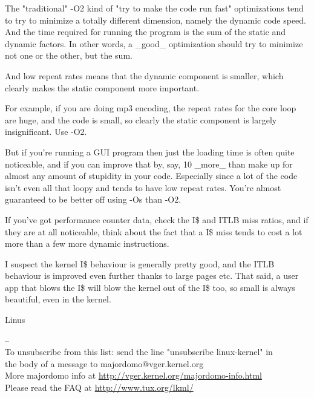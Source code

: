 \documentclass[amstex,twoside]{ctexbook}
\newenvironment{insertnote}{ \ttfamily\CJKfamily{KaiTi} }{\vskip 0.5cm }
\begin{document}
\begin{insertnote}
The "traditional" -O2 kind of "try to make the code run fast" 
optimizations tend to try to minimize a totally different dimension, 
namely the dynamic code speed.
And the time required for running the program is the sum of the static and 
dynamic factors. In other words, a \_good\_ optimization should try to 
minimize not one or the other, but the sum.

And low repeat rates means that the dynamic component is smaller, which 
clearly makes the static component more important.

For example, if you are doing mp3 encoding, the repeat rates for the core 
loop are huge, and the code is small, so clearly the static component is 
largely insignificant. Use -O2.

But if you're running a GUI program then just the loading time is often
quite noticeable, and if you can improve that by, say, 10%
\_more\_ than make up for almost any amount of stupidity in your code.  
Especially since a lot of the code isn't even all that loopy and tends to
have low repeat rates. You're almost guaranteed to be better off using -Os
than -O2.

If you've got performance counter data, check the I\$ and ITLB miss ratios, 
and if they are at all noticeable, think about the fact that a I\$ miss 
tends to cost a lot more than a few more dynamic instructions. 

I suspect the kernel I\$ behaviour is generally pretty good, and the ITLB 
behaviour is improved even further thanks to large pages etc. That said, a 
user app that blows the I\$ will blow the kernel out of the I\$ too, so 
small is always beautiful, even in the kernel.

\qquad Linus

--\\
To unsubscribe from this list: send the line "unsubscribe linux-kernel" in \\
the body of a message to majordomo@vger.kernel.org \\
More majordomo info at  \url{http://vger.kernel.org/majordomo-info.html}\\
Please read the FAQ at  \url{http://www.tux.org/lkml/}

\end{insertnote}
\end{document}
